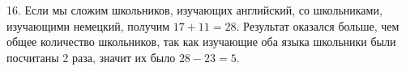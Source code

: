 16. Если мы сложим школьников, изучающих английский, со школьниками, изучающими немецкий, получим $17+11=28.$ Результат оказался больше, чем общее количество школьников, так как изучающие оба языка школьники были посчитаны 2 раза, значит их было $28-23=5.$\\
